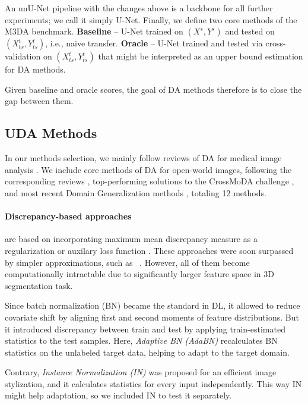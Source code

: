 An nnU-Net pipeline with the changes above is a backbone for all further experiments; we call it simply U-Net. Finally, we define two core methods of the M3DA benchmark. \textbf{Baseline} -- U-Net trained on $(X^s, Y^s)$ and tested on $(X^t_{ts}, Y^t_{ts})$, i.e., naive transfer. \textbf{Oracle} -- U-Net trained and tested via cross-validation on $(X^t_{ts}, Y^t_{ts})$ that might be interpreted as an upper bound estimation for DA methods.

Given baseline and oracle scores, the goal of DA methods therefore is to close the gap between them.


\subsection{UDA Methods}
\label{ssec:uda}

In our methods selection, we mainly follow reviews of DA for medical image analysis \cite{medim_da_survey_2021,medim_da_survey_2023}. We include core methods of DA for open-world images, following the corresponding reviews \cite{da_survey_2018,uda_survey_2020,uda_segm_review_2020}, top-performing solutions to the CrossMoDA challenge \cite{crossmoda}, and most recent Domain Generalization methods \cite{dg_tta}, totaling 12 methods.


\paragraph{Discrepancy-based approaches} are based on incorporating maximum mean discrepancy measure as a regularization or auxilary loss function \cite{mmd_ghifary2014domain,mmd_tzeng2014deep,mmd_long2015learning}. These approaches were soon surpassed by simpler approximations, such as ~\cite{deepcoral}. However, all of them become computationally intractable due to significantly larger feature space in 3D segmentation task.

Since batch normalization (BN) \cite{bn} became the standard in DL, it allowed to reduce covariate shift by aligning first and second moments of feature distributions. But it introduced discrepancy between train and test by applying train-estimated statistics to the test samples. Here, \textit{Adaptive BN (AdaBN)} \cite{adabn} recalculates BN statistics on the unlabeled target data, helping to adapt to the target domain.

Contrary, \textit{Instance Normalization (IN)} \cite{instance_norm} was proposed for an efficient image stylization, and it calculates statistics for every input independently. This way IN might help adaptation, so we included IN to test it separately.

